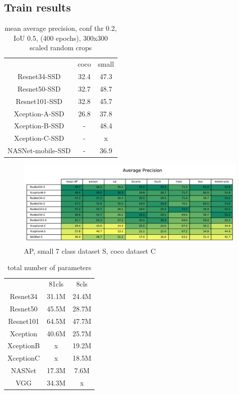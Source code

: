 \subsection{Train results}
\begin{table}
    \begin{tabular}{c|c|c}
                            & coco      & small \\
        Resnet34-SSD        & 32.4      & 47.3  \\
        Resnet50-SSD        & 32.7      & 48.7  \\
        Resnet101-SSD       & 32.8      & 45.7  \\
        Xception-A-SSD      & 26.8      & 37.8  \\
        Xception-B-SSD      & -         & 48.4  \\
        Xception-C-SSD      & -         & x     \\
        NASNet-mobile-SSD   & -         & 36.9  \\
    \end{tabular}
    \caption{mean average precision, conf thr 0.2, IoU 0.5,  (400 epochs), 300x300 scaled random crops}
    \label{tab:map}
\end{table}

\begin{figure}
    \centering
    \includegraphics[width=\textwidth]{img/ap}
    \caption{AP, small 7 class dataset S, coco dataset C}
    \label{fig:ap}
\end{figure}


\begin{table}
    \begin{tabular}{c|c|c}
                    & 81cls     & 8cls  \\
    Resnet34        & 31.1M     & 24.4M \\
    Resnet50        & 45.5M     & 28.7M \\
    Resnet101       & 64.5M     & 47.7M \\
    Xception        & 40.6M     & 25.7M \\
    XceptionB       & x         & 19.2M \\
    XceptionC       & x         & 18.5M \\
    NASNet          & 17.3M     & 7.6M  \\
    VGG             & 34.3M     & x \\
    \end{tabular}
    \caption{total number of parameters}
    \label{tab:parameters}
\end{table}

